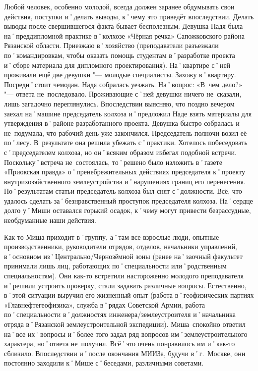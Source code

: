 Любой человек, особенно молодой, всегда должен заранее обдумывать свои действия, поступки и˚делать выводы, к˚чему это приведёт впоследствии. Делать выводы после свершившегося факта бывает бесполезным. Девушка Надя была на˚преддипломной практике в˚колхозе «Чёрная речка» Сапожковского района Рязанской области. Приезжаю в˚хозяйство (преподаватели разъезжали по˚командировкам, чтобы оказать помощь студентам в˚разработке проекта и˚сборе материала для дипломного проектирования). На˚квартире с˚ней проживали ещё две девушки "--- молодые специалисты. Захожу в˚квартиру. Посреди˚стоит чемодан. Надя собралась уезжать. На˚вопрос: «В~чем дело?» "--- ответа не~последовало. Проживающие с˚ней девушки ничего не~сказали, лишь загадочно переглянулись. Впоследствии выясняю, что поздно вечером заехал на˚машине председатель колхоза и˚предложил Наде взять материалы для утверждения в˚районе разработанного проекта. Девушка быстро собралась и не~подумала, что рабочий день уже закончился. Председатель полночи возил её по˚лесу. В~результате она решила убежать с˚практики. Хотелось побеседовать с˚председателем колхоза, но он˚всяким образом избегал подобной встречи. Поскольку˚встреча не~состоялась, то˚решено было изложить в˚газете «Приокская правда» о˚пренебрежительных действиях председателя к˚проекту внутрихозяйственного землеустройства и˚нарушениях границ его перенесения. По˚результатам статьи председатель колхоза был снят с˚должности. Всё, что удалось сделать за˚безнравственный проступок председателя колхоза. На˚сердце долго у˚Миши оставался горький осадок, к˚чему могут привести безрассудные, необдуманные наши действия.

Как-то Миша приходит в˚группу, а˚там все взрослые люди, опытные производственники, руководители отрядов, отделов, начальники управлений, в˚основном из˚Центрально\-/Чернозёмной зоны (ранее на˚заочный факультет принимали лишь лиц, работающих по˚специальности или˚родственным специальностям). Они как-то встретили настороженно молодого преподавателя и˚решили устроить проверку, стали задавать различные вопросы. Естественно, в˚этой ситуации выручил его жизненный опыт (работа в˚геофизических партиях «Главнефтегеофизика», служба в˚рядах Советской Армии, работа по˚специальности в˚должностях инженера\-/землеустроителя и˚начальника отряда в˚Рязанской землеустроительной экспедиции). Миша~спокойно ответил на˚все их˚вопросы и˚более того задал ряд вопросов им˚землеустроительного характера, но˚ответа не~получил. Всё˚это очень понравилось им и˚как-то сблизило. Впоследствии и˚после окончания МИИЗа, будучи в˚г.~Москве, они постоянно заходили к˚Мише с˚беседами, различными советами. 

